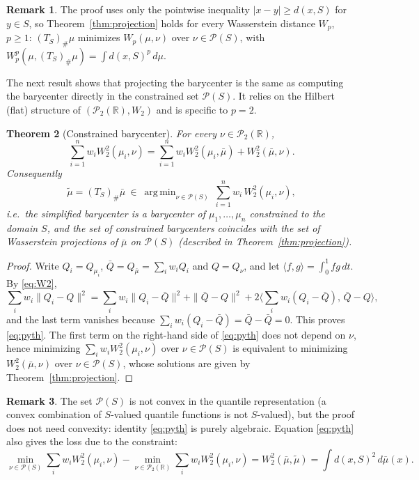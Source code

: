 \documentclass[11pt,a4paper]{article}
\newtheorem{theorem}{Theorem}
\theoremstyle{definition}
\newtheorem{remark}[theorem]{Remark}
\newcommand{\R}{\mathbb{R}}
\newcommand{\PS}{\mathcal{P}(S)}
\DeclareMathOperator*{\argmin}{arg\,min}
\begin{document}
\begin{remark}
The proof uses only the pointwise inequality $|x-y|\ge d(x,S)$ for $y\in S$,
so Theorem~\ref{thm:projection} holds for every Wasserstein distance $W_p$,
$p\ge 1$: $(T_S)_{\#}\mu$ minimizes $W_p(\mu,\nu)$ over $\nu\in\PS$, with
$W_p^p(\mu,(T_S)_{\#}\mu)=\int d(x,S)^p\,d\mu$.
\end{remark}

The next result shows that projecting the barycenter is the same as computing
the barycenter directly in the constrained set $\PS$. It relies on the
Hilbert (flat) structure of $(\mathcal{P}_2(\R),W_2)$ and is specific to $p=2$.

\begin{theorem}[Constrained barycenter]\label{thm:constrained}
For every $\nu\in\mathcal{P}_2(\R)$,
\begin{equation}\label{eq:pyth}
  \sum_{i=1}^n w_i W_2^2(\mu_i,\nu)
  =\sum_{i=1}^n w_i W_2^2(\mu_i,\bar\mu)+W_2^2(\bar\mu,\nu).
\end{equation}
Consequently
\[
  \tilde\mu=(T_S)_{\#}\bar\mu\ \in\ \argmin_{\nu\in\PS}\ \sum_{i=1}^n w_i\,W_2^2(\mu_i,\nu),
\]
i.e.\ the simplified barycenter is a barycenter of $\mu_1,\dots,\mu_n$
constrained to the domain $S$, and the set of constrained barycenters coincides
with the set of Wasserstein projections of $\bar\mu$ on $\PS$
(described in Theorem~\ref{thm:projection}).
\end{theorem}

\begin{proof}
Write $Q_i=Q_{\mu_i}$, $\bar Q=Q_{\bar\mu}=\sum_i w_iQ_i$ and $Q=Q_\nu$, and let
$\langle f,g\rangle=\int_0^1 fg\,dt$. By \eqref{eq:W2},
\[
  \sum_i w_i\|Q_i-Q\|^2=\sum_i w_i\|Q_i-\bar Q\|^2+\|\bar Q-Q\|^2
  +2\Big\langle \sum_i w_i(Q_i-\bar Q),\,\bar Q-Q\Big\rangle ,
\]
and the last term vanishes because $\sum_i w_i(Q_i-\bar Q)=\bar Q-\bar Q=0$.
This proves \eqref{eq:pyth}. The first term on the right-hand side of
\eqref{eq:pyth} does not depend on $\nu$, hence minimizing
$\sum_i w_iW_2^2(\mu_i,\nu)$ over $\nu\in\PS$ is equivalent to minimizing
$W_2^2(\bar\mu,\nu)$ over $\nu\in\PS$, whose solutions are given by
Theorem~\ref{thm:projection}.
\end{proof}

\begin{remark}
The set $\PS$ is not convex in the quantile representation (a convex
combination of $S$-valued quantile functions is not $S$-valued), but the proof
does not need convexity: identity \eqref{eq:pyth} is purely algebraic.
Equation \eqref{eq:pyth} also gives the loss due to the constraint:
\[
  \min_{\nu\in\PS}\sum_i w_iW_2^2(\mu_i,\nu)-\min_{\nu\in\mathcal{P}_2(\R)}\sum_i w_iW_2^2(\mu_i,\nu)
  = W_2^2(\bar\mu,\tilde\mu)=\int d(x,S)^2\,d\bar\mu(x).
\]
\end{remark}
\end{document}
